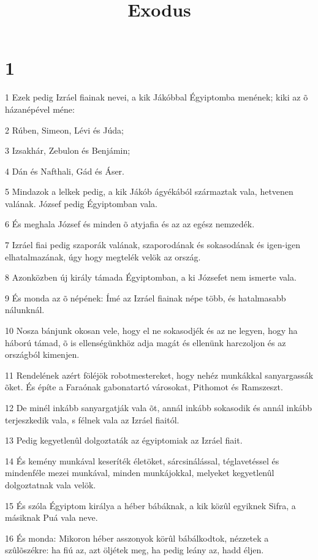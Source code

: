 

\title{Exodus}


\chapter{1}

\par 1 Ezek pedig Izráel fiainak nevei, a kik Jákóbbal Égyiptomba menének; kiki az õ házanépével méne:
\par 2 Rúben, Simeon, Lévi és Júda;
\par 3 Izsakhár, Zebulon és Benjámin;
\par 4 Dán és Nafthali, Gád és Áser.
\par 5 Mindazok a lelkek pedig, a kik Jákób ágyékából származtak vala, hetvenen valának. József pedig Égyiptomban vala.
\par 6 És meghala József és minden õ atyjafia és az az egész nemzedék.
\par 7 Izráel fiai pedig szaporák valának, szaporodának és sokasodának és igen-igen elhatalmazának, úgy hogy megtelék velök az ország.
\par 8 Azonközben új király támada Égyiptomban, a ki Józsefet nem ismerte vala.
\par 9 És monda az õ népének: Ímé az Izráel fiainak népe több, és hatalmasabb nálunknál.
\par 10 Nosza bánjunk okosan vele, hogy el ne sokasodjék és az ne legyen, hogy ha háború támad, õ is ellenségünkhöz adja magát és ellenünk harczoljon és az országból kimenjen.
\par 11 Rendelének azért föléjök robotmestereket, hogy nehéz munkákkal sanyargassák õket. És építe a Faraónak gabonatartó városokat, Pithomot és Ramszeszt.
\par 12 De minél inkább sanyargatják vala õt, annál inkább sokasodik és annál inkább terjeszkedik vala, s félnek vala az Izráel fiaitól.
\par 13 Pedig kegyetlenûl dolgoztaták az égyiptomiak az Izráel fiait.
\par 14 És kemény munkával keseríték életöket, sárcsinálással, téglavetéssel és mindenféle mezei munkával, minden munkájokkal, melyeket kegyetlenûl dolgoztatnak vala velök.
\par 15 És szóla Égyiptom királya a héber bábáknak, a kik közûl egyiknek Sifra, a másiknak Puá vala neve.
\par 16 És monda: Mikoron héber asszonyok körûl bábálkodtok, nézzetek a szûlõszékre: ha fiú az, azt öljétek meg, ha pedig leány az, hadd éljen.
